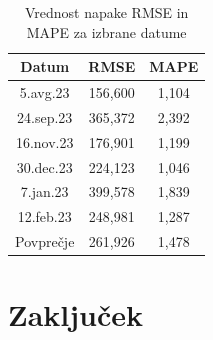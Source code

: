 \documentclass[a4paper, 11pt]{article}
\begin{document}
\begin{table}[!ht]
    \centering
    \caption{Vrednost napake RMSE in MAPE za izbrane datume}\par\medskip
    \label{Tab:RMSE_MAPE}
    \begin{tabular}{c|c|c}
        Datum & RMSE & MAPE \\ \hline
        5.avg.23 & 156,600 & 1,104 \\ 
        24.sep.23 & 365,372 & 2,392 \\ 
        16.nov.23 & 176,901 & 1,199 \\ 
        30.dec.23 & 224,123 & 1,046 \\ 
        7.jan.23 & 399,578 & 1,839 \\ 
        12.feb.23 & 248,981 & 1,287 \\ \hline
        Povprečje & 261,926 & 1,478 \\ 
    \end{tabular}
\end{table}








\section{Zaključek}




\pagebreak



\end{document}
